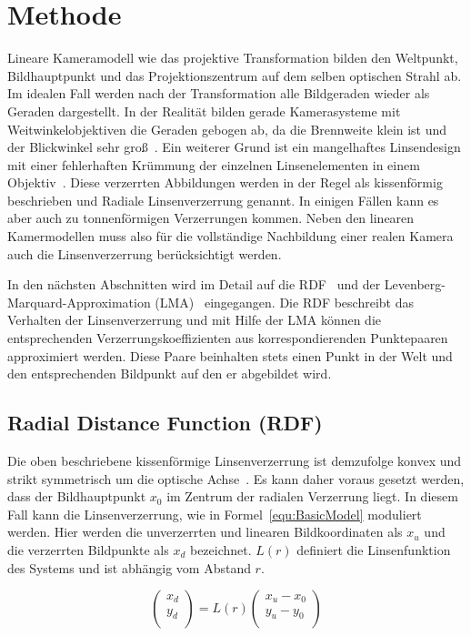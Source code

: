 \section{Methode}
Lineare Kameramodell wie das projektive Transformation bilden den Weltpunkt, Bildhauptpunkt und das Projektionszentrum auf dem selben optischen Strahl ab. Im idealen Fall werden nach der Transformation alle Bildgeraden wieder als Geraden dargestellt. In der Realität bilden gerade Kamerasysteme mit Weitwinkelobjektiven die Geraden gebogen ab, da die Brennweite klein ist und der Blickwinkel sehr groß~\cite{HartleyRadDist}. Ein weiterer Grund ist ein mangelhaftes Linsendesign mit einer fehlerhaften Krümmung der einzelnen Linsenelementen in einem Objektiv~\cite{WengRadDist}\cite{Zhang:1996:EGT:844381.845228}. Diese verzerrten Abbildungen werden in der Regel als kissenförmig beschrieben und Radiale Linsenverzerrung genannt. In einigen Fällen kann es aber auch zu tonnenförmigen Verzerrungen kommen. Neben den linearen Kamermodellen muss also für die vollständige Nachbildung einer realen Kamera auch die Linsenverzerrung berücksichtigt werden. 

In den nächsten Abschnitten wird im Detail auf die RDF~\cite{HartleyRadDist} und der Levenberg-Marquard-Approximation (LMA)~\cite{LevMarquardt} eingegangen. Die RDF beschreibt das Verhalten der Linsenverzerrung und mit Hilfe der LMA können die entsprechenden Verzerrungskoeffizienten aus korrespondierenden Punktepaaren  approximiert werden. Diese Paare beinhalten stets einen Punkt in der Welt und den entsprechenden Bildpunkt auf den er abgebildet wird.

\subsection{Radial Distance Function (RDF)}
Die oben beschriebene kissenförmige Linsenverzerrung ist demzufolge konvex und strikt symmetrisch um die optische Achse~\cite{WengRadDist}. Es kann daher voraus gesetzt werden, dass der Bildhauptpunkt $x_0$ im Zentrum der radialen Verzerrung liegt. In diesem Fall kann die Linsenverzerrung, wie in Formel~\ref{equ:BasicModel} moduliert werden. Hier werden die unverzerrten und linearen Bildkoordinaten als $x_u$ und die verzerrten Bildpunkte als $x_d$ bezeichnet. $L(r)$ definiert die Linsenfunktion des Systems und ist abhängig vom Abstand $r$.

\begin{equation}
\label{equ:BasicModel}
\begin{pmatrix}
x_d \\
y_d\\
\end{pmatrix} =
L(r)
\begin{pmatrix}
x_u-x_0\\
y_u -y_0\\
\end{pmatrix}
\end{equation}

